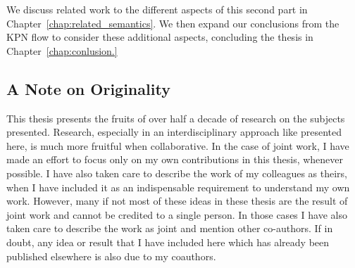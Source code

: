 We discuss related work to the different aspects of this second part in Chapter~\ref{chap:related_semantics}.
We then expand our conclusions from the \ac{KPN} flow to consider these additional aspects, concluding the thesis in Chapter~\ref{chap:conlusion.}

\subsection{A Note on Originality}

This thesis presents the fruits of over half a decade of research on the subjects presented.
Research, especially in an interdisciplinary approach like presented here, is much more fruitful when collaborative.
In the case of joint work, I have made an effort to focus only on my own contributions in this thesis, whenever possible.
I have also taken care to describe the work of my colleagues as theirs, when I have included it as an indispensable requirement to understand my own work.
However,  many if not most of these ideas in these thesis are the result of joint work and cannot be credited to a single person.
In those cases I have also taken care to describe the work as joint and mention other co-authors.
If in doubt, any idea or result that I have included here which has already been published elsewhere is also due to my coauthors.

%


